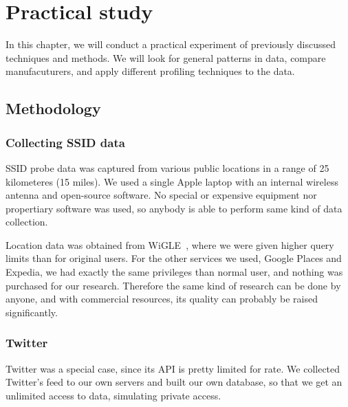 \documentclass[12pt,a4paper,oneside,pdftex]{report}
\begin{document}





\chapter{Practical study}
\label{chapter:practical}

In this chapter, we will conduct a practical experiment of previously discussed techniques and methods. We will look for general patterns in data, compare manufacuturers, and apply different profiling techniques to the data. 

\section{Methodology}
\label{sec:methods}

\subsection{Collecting SSID data}

SSID probe data was captured from various public locations in a range of 25 kilometeres (15 miles). We used a single Apple laptop with an internal wireless antenna and open-source software. No special or expensive equipment nor propertiary software was used, so anybody is able to perform same kind of data collection.

Location data was obtained from WiGLE~\cite{wigle}, where we were given higher query limits than for original users. For the other services we used, Google Places and Expedia, we had exactly the same privileges than normal user, and nothing was purchased for our research. Therefore the same kind of research can be done by anyone, and with commercial resources, its quality can probably be raised significantly.

\subsection{Twitter}

Twitter was a special case, since its API is pretty limited for rate. We collected Twitter's feed to our own servers and built our own database, so that we get an unlimited access to data, simulating private access. 
\end{document}
